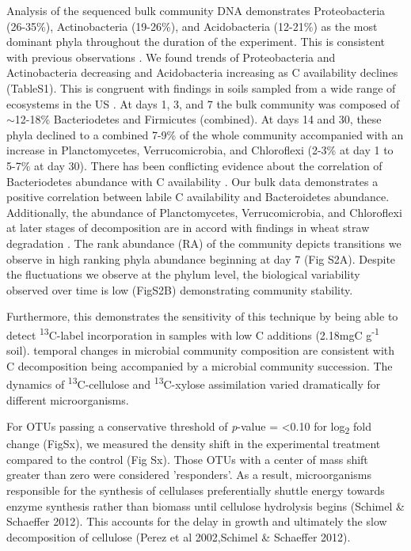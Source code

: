 Analysis of the sequenced bulk community DNA demonstrates Proteobacteria (26-35\%), Actinobacteria (19-26\%), and Acidobacteria (12-21\%) as the most dominant phyla throughout the duration of the experiment. This is consistent with previous observations \cite{Goldfarb_2011,Fierer_2007,Rui_2009,Fierer_2012}. We found trends of Proteobacteria and Actinobacteria decreasing and Acidobacteria increasing as C availability declines (TableS1). This is congruent with findings in soils sampled from a wide range of ecosystems in the US \cite{Fierer_2007}. At days 1, 3, and 7 the bulk community was composed of $\sim$12-18\% Bacteriodetes and Firmicutes (combined).  At days 14 and 30, these phyla declined to a combined 7-9\% of the whole community accompanied with an increase in Planctomycetes, Verrucomicrobia, and Chloroflexi (2-3\% at day 1 to 5-7\% at day 30). There has been conflicting evidence about the correlation of Bacteriodetes abundance with C availability \cite{Fierer_2007,Rui_2009,Sharp_2000,L_pez_Lozano_2013,Bastian_2009}. Our bulk data demonstrates a positive correlation between labile C availability and Bacteroidetes abundance. Additionally, the abundance of Planctomycetes, Verrucomicrobia, and Chloroflexi at later stages of decomposition are in accord with findings in wheat straw degradation \cite{Bastian_2009}. The rank abundance (RA) of the community depicts transitions we observe in high ranking phyla abundance beginning at day 7 (Fig S2A). Despite the fluctuations we observe at the phylum level, the biological variability observed over time is low (FigS2B) demonstrating community stability.


Furthermore, this demonstrates the sensitivity of this technique by being able to detect \textsuperscript{13}C-label incorporation in samples with low C additions (2.18mgC g\textsuperscript{-1} soil).    
temporal changes in microbial community composition are consistent with C decomposition being accompanied by a microbial community succession. The dynamics of \textsuperscript{13}C-cellulose and \textsuperscript{13}C-xylose assimilation varied dramatically for different microorganisms.

For OTUs passing a conservative threshold of \textit{p}-value = <0.10 for log\textsubscript{2} fold change (FigSx), we measured the density shift in the experimental treatment compared to the control (Fig Sx).  Those OTUs with a center of mass shift greater than zero were considered 'responders'.   
 As a result, microorganisms responsible for the synthesis of cellulases preferentially shuttle energy towards enzyme synthesis rather than biomass until cellulose hydrolysis begins (Schimel & Schaeffer 2012). This accounts for the delay in growth and ultimately the slow decomposition of cellulose (Perez et al 2002,Schimel & Schaeffer 2012).  

